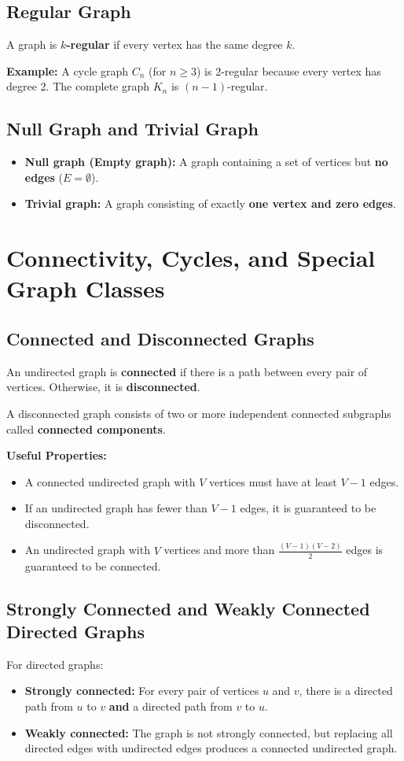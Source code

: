 \subsection{Regular Graph}
A graph is \textbf{$k$-regular} if every vertex has the same degree $k$.

\textbf{Example:} A cycle graph $C_n$ (for $n \geq 3$) is 2-regular because every vertex has degree 2. The complete graph $K_n$ is $(n-1)$-regular.

\subsection{Null Graph and Trivial Graph}
\begin{itemize}
    \item \textbf{Null graph (Empty graph):} A graph containing a set of vertices but \textbf{no edges} ($E = \emptyset$).
    \item \textbf{Trivial graph:} A graph consisting of exactly \textbf{one vertex and zero edges}.
\end{itemize}

\section{Connectivity, Cycles, and Special Graph Classes}

\subsection{Connected and Disconnected Graphs}
An undirected graph is \textbf{connected} if there is a path between every pair of vertices. Otherwise, it is \textbf{disconnected}.

A disconnected graph consists of two or more independent connected subgraphs called \textbf{connected components}.

\textbf{Useful Properties:}
\begin{itemize}
    \item A connected undirected graph with $V$ vertices must have at least $V - 1$ edges.
    \item If an undirected graph has fewer than $V - 1$ edges, it is guaranteed to be disconnected.
    \item An undirected graph with $V$ vertices and more than $\frac{(V-1)(V-2)}{2}$ edges is guaranteed to be connected.
\end{itemize}

\subsection{Strongly Connected and Weakly Connected Directed Graphs}
For directed graphs:
\begin{itemize}
    \item \textbf{Strongly connected:} For every pair of vertices $u$ and $v$, there is a directed path from $u$ to $v$ \textbf{and} a directed path from $v$ to $u$.
    \item \textbf{Weakly connected:} The graph is not strongly connected, but replacing all directed edges with undirected edges produces a connected undirected graph.
\end{itemize}

